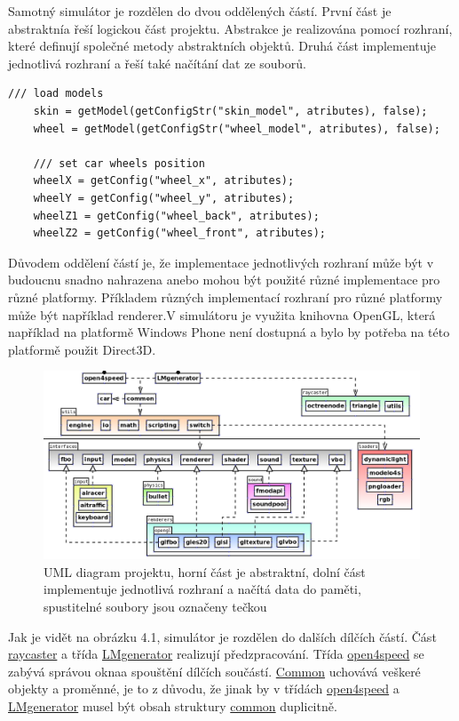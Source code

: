 \documentclass[11pt,twoside,a4paper]{book}
\begin{document}
Samotný simulátor je rozdělen do dvou oddělených částí. První část je abstraktní\linebreak a řeší logickou část projektu. Abstrakce je realizována pomocí rozhraní, které definují společné metody abstraktních objektů. Druhá část implementuje jednotlivá rozhraní a řeší také načítání dat ze souborů.
\lstset{language=C++} 
\begin{lstlisting}[caption=Načtení 3D modelu vozidla pomocí abstraktního přístupu]
    /// load models
    skin = getModel(getConfigStr("skin_model", atributes), false);
    wheel = getModel(getConfigStr("wheel_model", atributes), false);

    /// set car wheels position
    wheelX = getConfig("wheel_x", atributes);
    wheelY = getConfig("wheel_y", atributes);
    wheelZ1 = getConfig("wheel_back", atributes);
    wheelZ2 = getConfig("wheel_front", atributes);
\end{lstlisting}
\newpage

Důvodem oddělení částí je, že implementace jednotlivých rozhraní může být v budoucnu snadno nahrazena anebo mohou být použité různé implementace pro různé platformy. Příkladem různých implementací rozhraní pro různé platformy může být například renderer.\linebreak V simulátoru je využita knihovna OpenGL, která například na platformě Windows Phone není dostupná a bylo by potřeba na této platformě použit Direct3D.

\begin{figure}[h]
\begin{center}
\includegraphics[width=160mm]{figures/o4suml.png}
\caption{UML diagram projektu, horní část je abstraktní, dolní část implementuje jednotlivá rozhraní a načítá data do paměti, spustitelné soubory jsou označeny tečkou}
\end{center}
\end{figure}
Jak je vidět na obrázku 4.1, simulátor je rozdělen do dalších dílčích částí. Část \ul{raycaster} a třída \ul{LMgenerator} realizují předzpracování. Třída \ul{open4speed} se zabývá správou okna\linebreak a spouštění dílčích součástí. \ul{Common} uchovává veškeré objekty a proměnné, je to z důvodu, že jinak by v třídách \ul{open4speed} a \ul{LMgenerator} musel být obsah struktury \ul{common} duplicitně.
\end{document}
